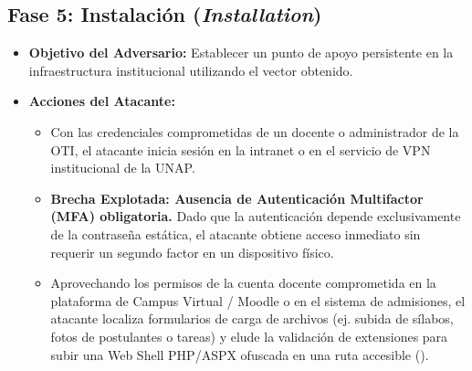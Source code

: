 \subsection*{Fase 5: Instalación (\textit{Installation})}
\begin{itemize}
    \item \textbf{Objetivo del Adversario:} Establecer un punto de apoyo persistente en la infraestructura institucional utilizando el vector obtenido.
    \item \textbf{Acciones del Atacante:}
    \begin{itemize}
        \item Con las credenciales comprometidas de un docente o administrador de la OTI, el atacante inicia sesión en la intranet o en el servicio de VPN institucional de la UNAP.
        \item \textbf{Brecha Explotada: Ausencia de Autenticación Multifactor (MFA) obligatoria.} Dado que la autenticación depende exclusivamente de la contraseña estática, el atacante obtiene acceso inmediato sin requerir un segundo factor en un dispositivo físico.
        \item Aprovechando los permisos de la cuenta docente comprometida en la plataforma de Campus Virtual / Moodle o en el sistema de admisiones, el atacante localiza formularios de carga de archivos (ej. subida de sílabos, fotos de postulantes o tareas) y elude la validación de extensiones para subir una Web Shell PHP/ASPX ofuscada en una ruta accesible ().
    \end{itemize}
\end{itemize}

